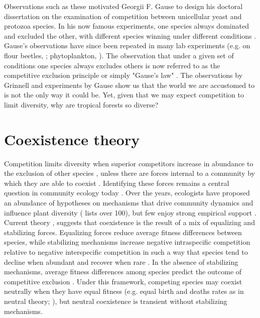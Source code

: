 \documentclass[b5paper,justified]{tufte-book} %
\begin{document}
\begin{fullwidth} 
Observations such as these motivated Georgii F. Gause to design his doctoral dissertation on the examination of competition between unicellular yeast and protozoa species. In his now famous experiments, one species always dominated and excluded the other, with different species winning under different conditions \citep{Gause1934}. Gause's observations have since been repeated in many lab experiments (e.g. on flour beetles, \citealt{Park1948}; phytoplankton, \citealt{Titman1976, Tilman1977}). The observation that under a given set of conditions one species always excludes others is now referred to as the competitive exclusion principle or simply "Gause's law" \citep{Kingsland1991}. The observations by Grinnell and experiments by Gause show us that the world we are accustomed to is not the only way it could be. Yet, given that we may expect competition to limit diversity, why are tropical forests so diverse? 

\section{Coexistence theory}
Competition limits diversity when superior competitors increase in abundance to the exclusion of other species \citep{Gause1934}, unless there are forces internal to a community by which they are able to coexist \citep{Chesson2000, Holt2007}. Identifying these forces remains a central question in community ecology today \citep{Siepielski2010, Vellend2010, Comita2014}. Over the years, ecologists have proposed an abundance of hypotheses on mechanisms that drive community dynamics and influence plant diversity (\citealt{Palmer1994} lists over 100), but few enjoy strong empirical support \citep{Wright2002}. Current theory \citep{Chesson2000, Adler2007}, suggests that coexistence is the result of a mix of equalizing and stabilizing forces. Equalizing forces reduce average fitness differences between species, while stabilizing mechanisms increase negative intraspecific competition relative to negative interspecific competition in such a way that species tend to decline when abundant and recover when rare \citep{Chesson2000, Adler2007}.  In the absence of stabilizing mechanisms, average fitness differences among species predict the outcome of competitive exclusion \citep{Chesson2008}. Under this framework, competing species may coexist neutrally when they have equal fitness (e.g. equal birth and deaths  rates as in neutral theory; \citealt{Hubbell2001}), but neutral coexistence is transient without stabilizing mechanisms.  


\end{fullwidth}
\end{document}
